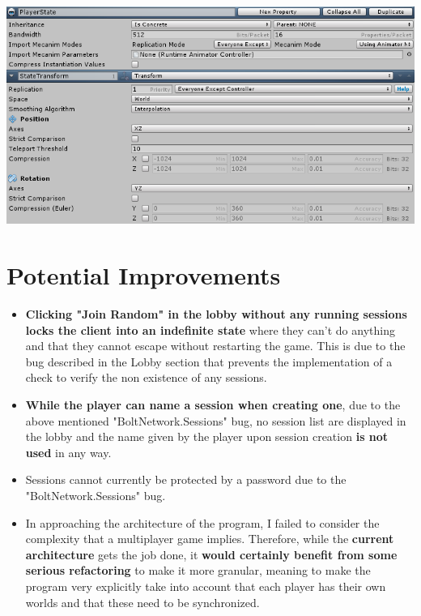 \documentclass[12pt,a4paper]{article}
\begin{document}
\begin{center}
\includegraphics[scale=0.9]{statePacketOptimisation}
\end{center}

\newpage

\section{Potential Improvements}
\begin{itemize}
\item \textbf{Clicking "Join Random" in the lobby without any running sessions locks the client into an indefinite state} where they can't do anything and that they cannot escape without restarting the game. This is due to the bug described in the Lobby section that prevents the implementation of a check to verify the non existence of any sessions.
\item \textbf{While the player can name a session when creating one}, due to the above mentioned "BoltNetwork.Sessions" bug, no session list are displayed in the lobby and the name given by the player upon session creation \textbf{is not used} in any way.
\item Sessions cannot currently be protected by a password due to the "BoltNetwork.Sessions" bug.
\item In approaching the architecture of the program, I failed to consider the complexity that a multiplayer game implies. Therefore, while the \textbf{current architecture} gets the job done, it \textbf{would certainly benefit from some serious refactoring} to make it more granular, meaning to make the program very explicitly take into account that each player has their own worlds and that these need to be synchronized.
\end{itemize}
\end{document}
